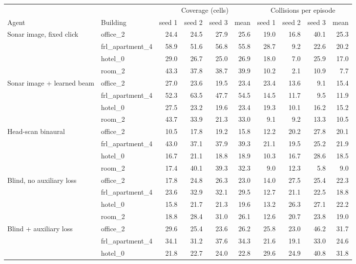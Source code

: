 \begin{tabular}{llrrrrrrrr}
\toprule
 & & \multicolumn{4}{c}{Coverage (cells)} & \multicolumn{4}{c}{Collisions per episode} \\
\cmidrule(lr){3-6}\cmidrule(lr){7-10}
Agent & Building & seed 1 & seed 2 & seed 3 & mean & seed 1 & seed 2 & seed 3 & mean \\
\midrule
Sonar image, fixed click & office\_2 & 24.4 & 24.5 & 27.9 & 25.6 & 19.0 & 16.8 & 40.1 & 25.3 \\
 & frl\_apartment\_4 & 58.9 & 51.6 & 56.8 & 55.8 & 28.7 & 9.2 & 22.6 & 20.2 \\
 & hotel\_0 & 29.0 & 26.7 & 25.0 & 26.9 & 18.0 & 7.0 & 25.9 & 17.0 \\
 & room\_2 & 43.3 & 37.8 & 38.7 & 39.9 & 10.2 & 2.1 & 10.9 & 7.7 \\
\addlinespace
Sonar image + learned beam & office\_2 & 27.0 & 23.6 & 19.5 & 23.4 & 23.4 & 13.6 & 9.1 & 15.4 \\
 & frl\_apartment\_4 & 52.3 & 63.5 & 47.7 & 54.5 & 14.5 & 11.7 & 9.5 & 11.9 \\
 & hotel\_0 & 27.5 & 23.2 & 19.6 & 23.4 & 19.3 & 10.1 & 16.2 & 15.2 \\
 & room\_2 & 43.7 & 33.9 & 21.3 & 33.0 & 9.1 & 9.2 & 13.3 & 10.5 \\
\addlinespace
Head-scan binaural & office\_2 & 10.5 & 17.8 & 19.2 & 15.8 & 12.2 & 20.2 & 27.8 & 20.1 \\
 & frl\_apartment\_4 & 43.0 & 37.1 & 37.9 & 39.3 & 21.1 & 19.5 & 25.2 & 21.9 \\
 & hotel\_0 & 16.7 & 21.1 & 18.8 & 18.9 & 10.3 & 16.7 & 28.6 & 18.5 \\
 & room\_2 & 17.4 & 40.1 & 39.3 & 32.3 & 9.0 & 12.3 & 5.8 & 9.0 \\
\addlinespace
Blind, no auxiliary loss & office\_2 & 17.8 & 24.8 & 26.3 & 23.0 & 14.0 & 27.5 & 25.4 & 22.3 \\
 & frl\_apartment\_4 & 23.6 & 32.9 & 32.1 & 29.5 & 12.7 & 21.1 & 22.5 & 18.8 \\
 & hotel\_0 & 15.8 & 21.7 & 21.3 & 19.6 & 13.2 & 26.3 & 27.1 & 22.2 \\
 & room\_2 & 18.8 & 28.4 & 31.0 & 26.1 & 12.6 & 20.7 & 23.8 & 19.0 \\
\addlinespace
Blind + auxiliary loss & office\_2 & 29.6 & 25.4 & 23.6 & 26.2 & 25.8 & 23.0 & 46.2 & 31.7 \\
 & frl\_apartment\_4 & 34.1 & 31.2 & 37.6 & 34.3 & 21.6 & 19.1 & 33.0 & 24.6 \\
 & hotel\_0 & 21.8 & 22.7 & 24.0 & 22.8 & 29.6 & 24.9 & 40.8 & 31.8 \\

\end{tabular}
